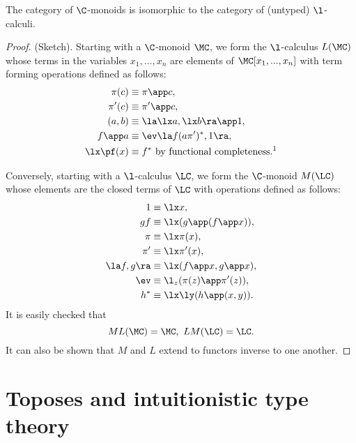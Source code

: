 \begin{thm}
The category of $\C$-monoids is isomorphic to the category of
(untyped) $\l$-calculi.
\end{thm}

\begin{proof}
(Sketch). Starting with a $\C$-monoid $\MC$, we form the $\l$-calculus
$L(\MC)$ whose terms in the variables $x_1, ... , x_n$ are elements of $\MC[x_1,...,x_n]$
with term forming operations defined as follows:
\begin{align*}
\pi(c) & \equiv \pi \app c,\\
\pi' (c) & \equiv \pi' \app c,\\
(a,b) & \equiv \la \lx a, \lx b\ra \app 1,\\
f \app a & \equiv \ev \la f(a \pi')^*,1 \ra,\\
\lx \pf(x) &\equiv f^* \,\, \text{by functional completeness.%
\footnotemark}
\end{align*}

Conversely, starting with a $\l$-calculus $\LC$, we form the $\C$-monoid $M(\LC)$
whose elements are the closed terms of $\LC$ with operations defined as follows:
\begin{align*}
1 &\equiv \lx x,\\
gf &\equiv \lx (g\app (f\app x)),\\
\pi & \equiv \lx \pi(x),\\
\pi' & \equiv \lx \pi'(x),\\
\la f,g \ra &\equiv \lx (f\app x, g \app x),\\
\ev & \equiv \l_z (\pi(z) \app \pi'(z)),\\
h^* & \equiv \lx\ly(h \app (x,y)).
\end{align*}
It is easily checked that
\[
ML(\MC) = \MC, \,\, LM(\LC) = \LC.
\]
It can also be shown that $M$ and $L$ extend to functors inverse to one
another.
\end{proof}

\section{Toposes and intuitionistic type theory}



